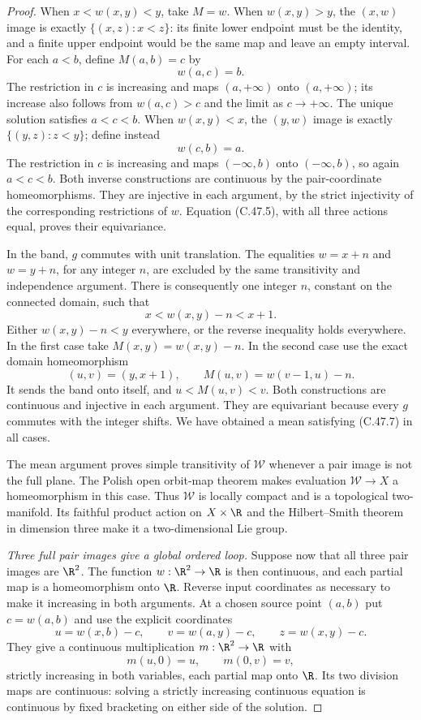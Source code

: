 \begin{proof}
When $x<w(x,y)<y$, take $M=w$.
When $w(x,y)>y$, the $(x,w)$ image is exactly
$\{(x,z):x<z\}$: its finite lower endpoint must be the identity,
and a finite upper endpoint would be the same map and leave
an empty interval. For each $a<b$, define $M(a,b)=c$ by
\[
                         w(a,c)=b.                      \tag{C.47.12}
\]
The restriction in $c$ is increasing and maps $(a,+\infty)$
onto $(a,+\infty)$; its increase also follows from
$w(a,c)>c$ and the limit as $c\to+\infty$.
The unique solution satisfies $a<c<b$.
When $w(x,y)<x$, the $(y,w)$ image is exactly
$\{(y,z):z<y\}$; define instead
\[
                         w(c,b)=a.                      \tag{C.47.13}
\]
The restriction in $c$ is increasing and maps
$(-\infty,b)$ onto $(-\infty,b)$, so again $a<c<b$.
Both inverse constructions are continuous by the pair-coordinate
homeomorphisms. They are injective in each argument, by the
strict injectivity of the corresponding restrictions of $w$.
Equation (C.47.5), with all three actions equal, proves their
equivariance.

In the band, $g$ commutes with unit translation.
The equalities $w=x+n$ and $w=y+n$, for any integer $n$, are
excluded by the same transitivity and independence argument.
There is consequently one integer $n$, constant on the connected
domain, such that
\[
                         x<w(x,y)-n<x+1.
 \]
Either $w(x,y)-n<y$ everywhere, or the reverse inequality holds
everywhere. In the first case take $M(x,y)=w(x,y)-n$.
In the second case use the exact domain homeomorphism
\[
          (u,v)=(y,x+1),\qquad
          M(u,v)=w(v-1,u)-n.                            \tag{C.47.14}
\]
It sends the band onto itself, and $u<M(u,v)<v$.
Both constructions are continuous and injective in each argument.
They are equivariant because every $g$ commutes with the
integer shifts. We have obtained a mean satisfying
(C.47.7) in all cases.

The mean argument proves simple transitivity of $\mathcal W$
whenever a pair image is not the full plane.
The Polish open orbit-map theorem makes evaluation
$\mathcal W\to X$ a homeomorphism in this case.
Thus $\mathcal W$ is locally compact and is a topological
two-manifold. Its faithful product action on $X\times\R$
and the Hilbert--Smith theorem in dimension three
\cite[Theorem~1.5 and the introductory reduction]{C_Pardon2013}
make it a two-dimensional Lie group.

\emph{Three full pair images give a global ordered loop.}
Suppose now that all three pair images are $\R^2$.
The function $w:\R^2\to\R$ is then continuous, and each partial
map is a homeomorphism onto $\R$. Reverse input coordinates
as necessary to make it increasing in both arguments.
At a chosen source point $(a,b)$ put $c=w(a,b)$ and use the
explicit coordinates
\[
 u=w(x,b)-c,\qquad v=w(a,y)-c,\qquad z=w(x,y)-c.
                                                        \tag{C.47.15}
\]
They give a continuous multiplication $m:\R^2\to\R$ with
\[
 m(u,0)=u,\qquad m(0,v)=v,                              \tag{C.47.16}
\]
strictly increasing in both variables, each partial map onto
$\R$. Its two division maps are continuous: solving a strictly
increasing continuous equation is continuous by fixed
bracketing on either side of the solution.


\end{proof}
